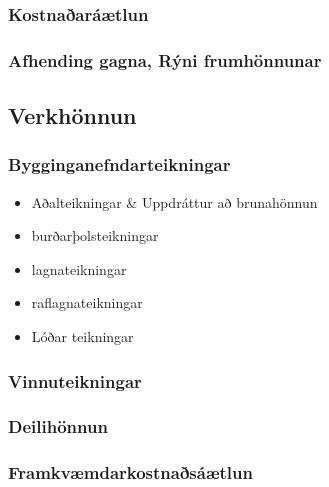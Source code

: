\documentclass[11pt]{article}
\begin{document}
\subsubsection{Kostnaðaráætlun}
\label{sec-1.2.3}


\subsubsection{Afhending gagna, Rýni frumhönnunar}
\label{sec-1.2.4}

\subsection{Verkhönnun}
\label{sec-1.3}

\subsubsection{Bygginganefndarteikningar}
\label{sec-1.3.1}

\begin{itemize}

\item Aðalteikningar \& Uppdráttur að brunahönnun\\
\label{sec-1.3.1.1}


\item burðarþolsteikningar\\
\label{sec-1.3.1.2}


\item lagnateikningar\\
\label{sec-1.3.1.3}


\item raflagnateikningar\\
\label{sec-1.3.1.4}


\item Lóðar teikningar\\
\label{sec-1.3.1.5}

\end{itemize} %
\subsubsection{Vinnuteikningar}
\label{sec-1.3.2}

\subsubsection{Deilihönnun}
\label{sec-1.3.3}

\subsubsection{Framkvæmdarkostnaðsáætlun}
\label{sec-1.3.4}
\end{document}
